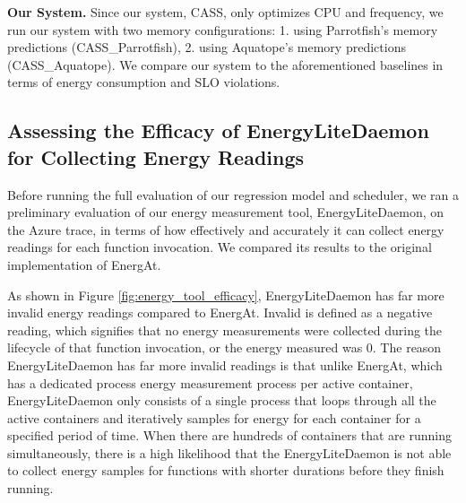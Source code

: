 \documentclass[times, 10pt,twocolumn]{article}
\begin{document}
\textbf{Our System.} Since our system, CASS, only optimizes CPU and frequency, we run our system with two memory configurations: 1. using Parrotfish's memory predictions (CASS\_Parrotfish), 2. using Aquatope's memory predictions (CASS\_Aquatope). We compare our system to the aforementioned baselines in terms of energy consumption and SLO violations.

\subsection{Assessing the Efficacy of EnergyLiteDaemon for Collecting Energy Readings}

Before running the full evaluation of our regression model and scheduler, we ran a preliminary evaluation of our energy measurement tool, EnergyLiteDaemon, on the Azure trace, in terms of how effectively and accurately it can collect energy readings for each function invocation. We compared its results to the original implementation of EnergAt.  

As shown in Figure \ref{fig:energy_tool_efficacy}, EnergyLiteDaemon has far more invalid energy readings compared to EnergAt. Invalid is defined as a negative reading, which signifies that no energy measurements were collected during the lifecycle of that function invocation, or the energy measured was 0. The reason EnergyLiteDaemon has far more invalid readings is that unlike EnergAt, which has a dedicated process energy measurement process per active container, EnergyLiteDaemon only consists of a single process that loops through all the active containers and iteratively samples for energy for each container for a specified period of time. When there are hundreds of containers that are running simultaneously, there is a high likelihood that the EnergyLiteDaemon is not able to collect energy samples for functions with shorter durations before they finish running. 
\end{document}
